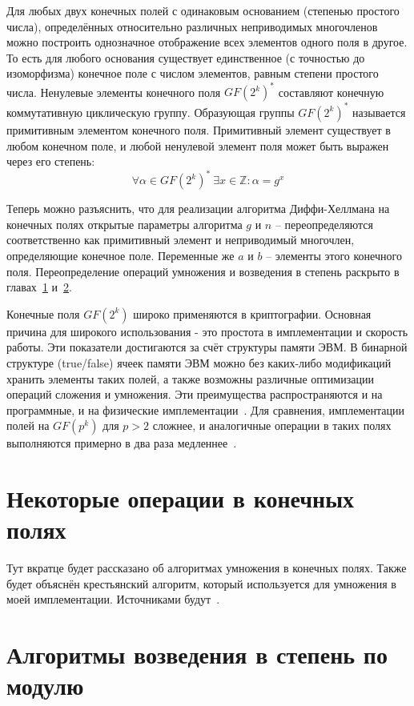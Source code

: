 \documentclass[times,specification,annotation]{itmo-student-thesis}
\begin{document}
Для любых двух конечных полей с одинаковым основанием (степенью простого числа), определённых относительно различных
неприводимых многочленов можно построить однозначное отображение всех элементов одного поля в другое.
То есть для любого основания существует единственное (с точностью до изоморфизма) конечное поле с числом
элементов, равным степени простого числа.
Ненулевые элементы конечного поля $GF(2^k)^*$ составляют конечную коммутативную циклическую группу.
Образующая группы $GF(2^k)^*$ называется примитивным элементом конечного поля.
Примитивный элемент существует в любом конечном поле, и любой ненулевой элемент поля может быть выражен через его степень:
\[\forall \alpha \in GF(2^k)^* ~ \exists x \in \mathbb{Z}: \alpha = g^x\]

Теперь можно разъяснить, что для реализации алгоритма Диффи-Хеллмана на конечных полях открытые параметры алгоритма
$g$ и $n$ -- переопределяются соответственно как примитивный элемент и неприводимый многочлен, определяющие конечное поле.
Переменные же $a$ и $b$ -- элементы этого конечного поля.
Переопределение операций умножения и возведения в степень раскрыто в главах~\ref{sec:oper} и~\ref{sec:exp}.

Конечные поля $GF(2^k)$ широко применяются в криптографии.
Основная причина для широкого использования - это простота в имплементации и скорость работы.
Эти показатели достигаются за счёт структуры памяти ЭВМ.
В бинарной структуре (true/false) ячеек памяти ЭВМ можно без каких-либо модификаций хранить элементы
таких полей, а также возможны различные оптимизации операций сложения и умножения.
Эти преимущества распространяются и на программные, и на физические имплементации~\cite{koc98}.
Для сравнения, имплементации полей на $GF(p^k)$ для $p > 2$ сложнее, и аналогичные операции в таких полях выполняются
примерно в два раза медленнее~\cite{mau15}.


\section{Некоторые операции в конечных полях}\label{sec:oper}

Тут вкратце будет рассказано об алгоритмах умножения в конечных полях.
Также будет объяснён крестьянский алгоритм, который используется для умножения в моей имплементации.
Источниками будут~\cite{knu97, men01, koc98}.

\section{Алгоритмы возведения в степень по модулю}\label{sec:exp}
\end{document}
